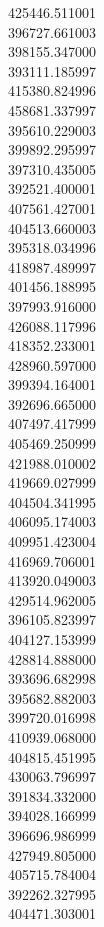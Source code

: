 425446.511001\\
396727.661003\\
398155.347000\\
393111.185997\\
415380.824996\\
458681.337997\\
395610.229003\\
399892.295997\\
397310.435005\\
392521.400001\\
407561.427001\\
404513.660003\\
395318.034996\\
418987.489997\\
401456.188995\\
397993.916000\\
426088.117996\\
418352.233001\\
428960.597000\\
399394.164001\\
392696.665000\\
407497.417999\\
405469.250999\\
421988.010002\\
419669.027999\\
404504.341995\\
406095.174003\\
409951.423004\\
416969.706001\\
413920.049003\\
429514.962005\\
396105.823997\\
404127.153999\\
428814.888000\\
393696.682998\\
395682.882003\\
399720.016998\\
410939.068000\\
404815.451995\\
430063.796997\\
391834.332000\\
394028.166999\\
396696.986999\\
427949.805000\\
405715.784004\\
392262.327995\\
404471.303001\\
